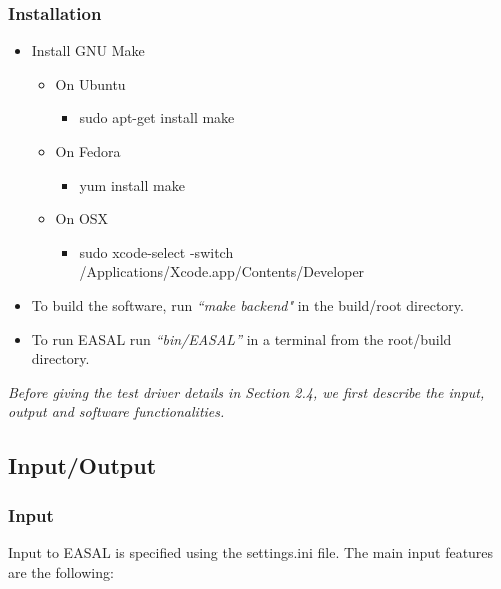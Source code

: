 \documentclass[10pt]{article}
\begin{document}
 
\subsubsection{Installation}
\begin{itemize}
	 \item Install GNU Make
	   \begin{itemize}
	   	   \item On Ubuntu 
	   	   \begin{itemize}
			\item sudo apt-get install make
		   \end{itemize}	
		   \item On Fedora
		   \begin{itemize}
			\item yum install make
		   \end{itemize}
		   \item On OSX
		   \begin{itemize}
		   \item sudo xcode-select -switch /Applications/Xcode.app/Contents/Developer
		   \end{itemize}
		   \end{itemize}
	 
	 \item To build the software, run \emph{``make backend"} in the build/root directory.
	 \item To run EASAL run \emph{``bin/EASAL''} in a terminal from the root/build directory.
\end{itemize}%

\emph{Before giving the test driver details in Section 2.4, we first describe the input, output and software functionalities.}

\subsection{Input/Output}

\subsubsection{Input}
Input to EASAL is specified using the settings.ini file. The main input features are the following:
\end{document}
